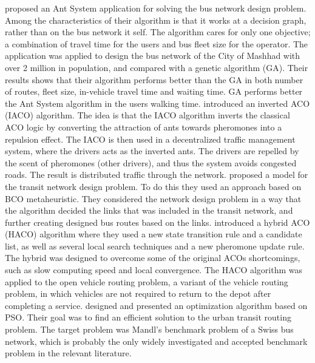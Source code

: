 \citet{poorzahedy11} proposed an Ant System application for solving the bus network design problem. Among the characteristics of their algorithm is that it works at a decision graph, rather than on the bus network it self. The algorithm cares for only one objective; a combination of travel time for the users and bus fleet size for the operator. The application was applied to design the bus network of the City of Mashhad with over 2 million in population, and compared with a genetic algorithm (GA). Their results shows that their algorithm performs better than the GA in both number of routes, fleet size, in-vehicle travel time and waiting time. GA performs better the Ant System algorithm in the users walking time. \citet{dias14} introduced an inverted ACO (IACO) algorithm. The idea is that the IACO algorithm inverts the classical ACO logic by converting the attraction of ants towards pheromones into a repulsion effect. The IACO is then used in a decentralized traffic management system, where the drivers acts as the inverted ants. The drivers are repelled by the scent of pheromones (other drivers), and thus the system avoids congested roads. The result is distributed traffic through the network. \citet{nikolic14} proposed a model for the transit network design problem. To do this they used an approach based on BCO metaheuristic. They considered the network design problem in a way that the algorithm decided the links that was included in the transit network, and further creating designed bus routes based on the links. \citet{sedighpour14} introduced a hybrid ACO (HACO) algorithm where they used a new state transition rule and a candidate list, as well as several local search techniques and a new pheromone update rule. The hybrid was designed to overcome some of the original ACOs shortcomings, such as slow computing speed and local convergence. The HACO algorithm was applied to the open vehicle routing problem, a variant of the vehicle routing problem, in which vehicles are not required to return to the depot after completing a service. \citet{kechagiopoulos14} designed and presented an optimization algorithm based on PSO. Their goal was to find an efficient solution to the urban transit routing problem. The target problem was Mandl's benchmark problem of a Swiss bus network, which is probably the only widely investigated and accepted benchmark problem in the relevant literature. 


